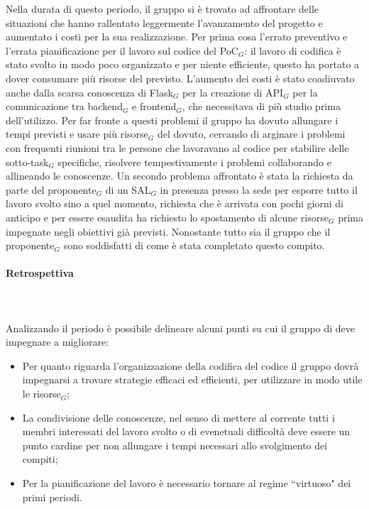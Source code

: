 Nella durata di questo periodo, il gruppo si è trovato ad affrontare delle situazioni che hanno rallentato leggermente l’avanzamento del progetto e aumentato i costi per la sua realizzazione. 
Per prima cosa l'errato preventivo e l'errata pianificazione per il lavoro sul codice del PoC$_G$: il lavoro di codifica è stato svolto in modo poco organizzato e per niente efficiente, questo ha portato a dover consumare più risorse del previsto. 
L'aumento dei costi è stato coadiuvato anche dalla scarsa conoscenza di Flask$_G$ per la creazione di API$_G$ per la comunicazione tra backend$_G$ e frontend$_G$, che necessitava di più studio prima dell'utilizzo.
Per far fronte a questi problemi il gruppo ha dovuto allungare i tempi previsti e usare più risorse$_G$ del dovuto, cercando di arginare i problemi con frequenti riunioni tra le persone che lavoravano al codice per stabilire delle sotto-task$_G$ specifiche, risolvere tempestivamente i problemi collaborando e allineando le conoscenze.
Un secondo problema affrontato è stata la richiesta da parte del proponente$_G$ di un SAL$_G$ in presenza presso la sede per esporre tutto il lavoro svolto sino a quel momento, richiesta che è arrivata con pochi giorni di anticipo e per essere esaudita ha richiesto lo spostamento di alcune risorse$_G$ prima impegnate negli obiettivi già previsti. Nonostante tutto sia il gruppo che il proponente$_G$ sono soddisfatti di come è stata completato questo compito.
\paragraph{Retrospettiva} \hspace{1cm} 
\\ \hspace{1cm} \\

Analizzando il periodo è possibile delineare alcuni punti su cui il gruppo di deve impegnare a migliorare:
\begin{itemize}
    \item Per quanto riguarda l'organizzazione della codifica del codice il gruppo dovrà impegnarsi a trovare strategie efficaci ed efficienti, per utilizzare in modo utile le risorse$_G$;
    \item La condivisione delle conoscenze, nel senso di mettere al corrente tutti i membri interessati del lavoro svolto o di evenetuali difficoltà deve essere un punto cardine per non allungare i tempi necessari allo svolgimento dei compiti;
    \item Per la pianificazione del lavoro è necessario tornare al regime ``virtuoso" dei primi periodi.
    
\end{itemize}

